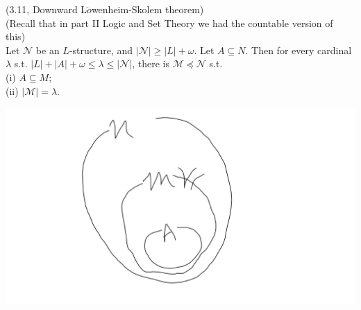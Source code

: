 \documentclass[a4paper]{article}
\begin{document}
\begin{thm} (3.11, Downward L$\ddot{o}$wenheim-Skolem theorem)\\
    (Recall that in part II Logic and Set Theory we had the countable version of this)\\
    Let $\mathcal{N}$ be an $L$-structure, and $|\mathcal{N}| \geq |L| + \omega$. Let $A \subseteq N$. Then for every cardinal $\lambda$ s.t. $|L|+|A|+\omega \leq \lambda \leq |\mathcal{N}|$, there is $\mathcal{M} \preccurlyeq \mathcal{N}$ s.t.\\
    (i) $A \subseteq M$;\\
    (ii) $|\mathcal{M}| = \lambda$.

    \includegraphics[scale=0.5]{image/Model_01.png}


\end{thm}
\end{document}
